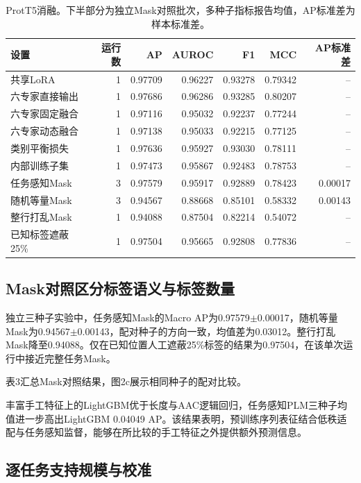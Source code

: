 \documentclass[conference]{IEEEtran}
\begin{document}
\begin{table}[t]
\centering
\caption{ProtT5消融。下半部分为独立Mask对照批次，多种子指标报告均值，AP标准差为样本标准差。}
\label{tab:3}
\footnotesize
\setlength{\tabcolsep}{3pt}
\begin{tabularx}{\textwidth}{@{}Xrrrrrr@{}}
\toprule
设置 & 运行数 & AP & AUROC & F1 & MCC & AP标准差 \\
\midrule
共享LoRA & 1 & 0.97709 & 0.96227 & 0.93278 & 0.79342 & -- \\
六专家直接输出 & 1 & 0.97686 & 0.96286 & 0.93285 & 0.80207 & -- \\
六专家固定融合 & 1 & 0.97116 & 0.95032 & 0.92237 & 0.77244 & -- \\
六专家动态融合 & 1 & 0.97138 & 0.95033 & 0.92215 & 0.77125 & -- \\
类别平衡损失 & 1 & 0.97636 & 0.95927 & 0.93030 & 0.78111 & -- \\
内部训练子集 & 1 & 0.97473 & 0.95867 & 0.92483 & 0.78753 & -- \\
\midrule
任务感知Mask & 3 & 0.97579 & 0.95917 & 0.92889 & 0.78423 & 0.00017 \\
随机等量Mask & 3 & 0.94567 & 0.88668 & 0.85101 & 0.58332 & 0.00143 \\
整行打乱Mask & 1 & 0.94088 & 0.87504 & 0.82214 & 0.54072 & -- \\
已知标签遮蔽25\% & 1 & 0.97504 & 0.95665 & 0.92808 & 0.77836 & -- \\
\bottomrule
\end{tabularx}
\end{table}

\subsection{Mask对照区分标签语义与标签数量}

独立三种子实验中，任务感知Mask的Macro AP为0.97579$\pm$0.00017，随机等量Mask为0.94567$\pm$0.00143，配对种子的方向一致，均值差为0.03012。整行打乱Mask降至0.94088。仅在已知位置人工遮蔽25\%标签的结果为0.97504，在该单次运行中接近完整任务Mask。

表3汇总Mask对照结果，图2c展示相同种子的配对比较。

丰富手工特征上的LightGBM优于长度与AAC逻辑回归，任务感知PLM三种子均值进一步高出LightGBM 0.04049 AP。该结果表明，预训练序列表征结合低秩适配与任务感知监督，能够在所比较的手工特征之外提供额外预测信息。

\subsection{逐任务支持规模与校准}
\end{document}
